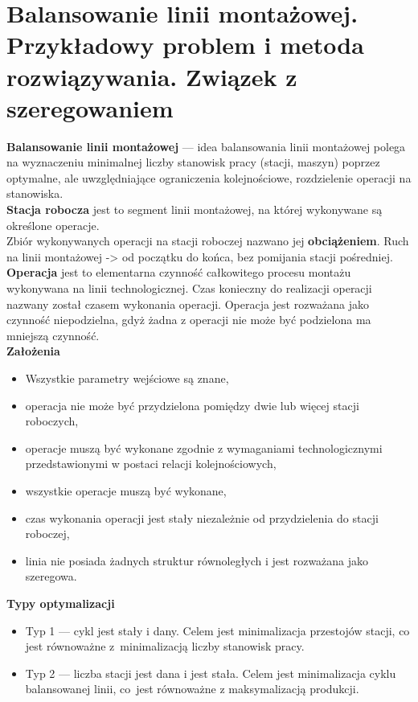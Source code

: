 \documentclass[10pt, a
4paper]{article}
\begin{document}
\section{Balansowanie linii montażowej. Przykładowy problem i metoda rozwiązywania. Związek z szeregowaniem}
\noindent \textbf{Balansowanie linii montażowej} --- idea balansowania linii montażowej polega na wyznaczeniu minimalnej liczby stanowisk pracy (stacji, maszyn) poprzez optymalne, ale uwzględniające ograniczenia kolejnościowe, rozdzielenie operacji na stanowiska.\\
\textbf{Stacja robocza} jest to segment linii montażowej, na której wykonywane są określone operacje.\\
Zbiór wykonywanych operacji na stacji roboczej nazwano jej \textbf{obciążeniem}. Ruch na linii montażowej -> od początku do końca, bez pomijania stacji pośredniej.\\
\textbf{Operacja} jest to elementarna czynność całkowitego procesu montażu wykonywana na linii technologicznej. Czas konieczny do realizacji operacji nazwany został czasem wykonania operacji. Operacja jest rozważana jako czynność niepodzielna, gdyż żadna
z operacji nie może być podzielona ma mniejszą czynność.\\
\textbf{Założenia}
\begin{itemize}
\item Wszystkie parametry wejściowe są znane,
\item operacja nie może być przydzielona pomiędzy dwie lub
więcej stacji roboczych,
\item operacje muszą być wykonane zgodnie z wymaganiami
technologicznymi przedstawionymi w postaci relacji kolejnościowych,
\item wszystkie operacje muszą być wykonane,
\item czas wykonania operacji jest stały niezależnie od
przydzielenia do stacji roboczej,
\item linia nie posiada żadnych struktur równoległych
i jest rozważana jako szeregowa.
\end{itemize}
\textbf{Typy optymalizacji}
\begin{itemize}
\item Typ 1 --- cykl jest stały i dany.
Celem jest minimalizacja przestojów stacji, co jest równoważne z~minimalizacją
liczby stanowisk pracy.
\item Typ 2 --- liczba stacji jest dana i jest stała.
Celem jest minimalizacja cyklu balansowanej linii, co~jest
równoważne z maksymalizacją produkcji.
\end{itemize}
\end{document}
